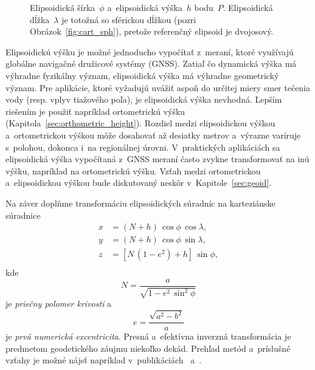 \documentclass[a4paper, 12pt]{book}
\begin{document}
\begin{figure}[bt]
\centering

\caption{Elipsoidická šírka~$\phi$ a~elipsoidická výška~$h$ bodu~$P$.  
Elipsoidická dĺžka~$\lambda$ je totožná so sférickou dĺžkou (pozri 
Obrázok~\ref{fig:cart_sph}), pretože referenčný elipsoid je dvojosový.}
\label{fig:ell_coords}
\end{figure}

Elipsoidickú výšku je možné jednoducho vypočítať z~meraní, ktoré využívajú 
globálne navigačné družicové systémy (GNSS).  Zatiaľ čo dynamická výška má 
výhradne fyzikálny význam, elipsoidická výška má výhradne geometrický význam.  
Pre aplikácie, ktoré vyžadujú uvážiť aspoň do určitej miery smer tečenia vody 
(resp. vplyv tiažového poľa), je elipsoidická výška nevhodná.  Lepším riešením 
je použiť napríklad ortometrickú výšku (Kapitola~\ref{sec:orthometric_height}).  
Rozdiel medzi elipsoidickou výškou a~ortometrickou výškou môže dosahovať až 
desiatky metrov a~výrazne varíruje s~polohou, dokonca i~na regionálnej úrovni.  
V~praktických aplikáciách sa elipsoidická výška vypočítaná z~GNSS meraní často 
zvykne transformovať na inú výšku, napríklad na ortometrickú výšku.  Vzťah 
medzi ortometrickou a~elipsoidickou výškou bude diskutovaný neskôr 
v~Kapitole~\ref{sec:geoid}.

Na záver doplňme transformáciu elipsoidických súradníc na karteziánske 
súradnice \parencite{MoritzPhysicalGeodesy}
%
\begin{equation}
\begin{split}
x &= (N + h) \, \cos\phi \, \cos\lambda{,}\\
y &= (N + h) \, \cos\phi \, \sin\lambda{,}\\
z &= \left[ N \, (1 - e^2) + h \right] \, \sin\phi{,}\\
\end{split}
\end{equation}
%
kde
%
\begin{equation}
\label{eq:curvature_N}
N = \frac{a}{\sqrt{1 - e^2 \, \sin^2\phi}}
\end{equation}
%
je \emph{priečny polomer krivosti} a
%
\begin{equation}
\label{eq:1st_eccentricity}
e = \frac{\sqrt{a^2 - b^2}}{a}
\end{equation}
%
je \emph{prvá numerická excentricita}.  Presná a~efektívna inverzná 
transformácia je predmetom geodetického záujmu niekoľko dekád.  Prehľad metód 
a~príslušné vzťahy je možné nájsť napríklad 
v~publikáciách~\textcite{Fukushima2006} a~\textcite{Claessens2019}.
\end{document}
